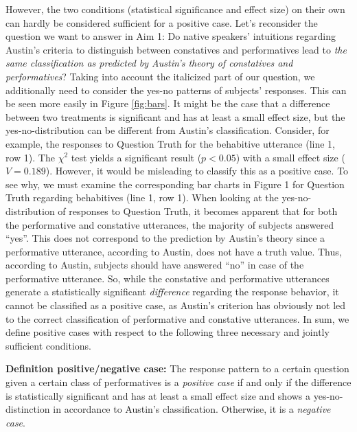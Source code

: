 \documentclass[egregdoesnotlikesansseriftitles,12pt]{scrartcl}
\begin{document}
\noindent However, the two conditions (statistical significance and effect size) on their own can hardly be considered sufficient for a positive case. Let's reconsider the question we want to answer in Aim 1: Do native speakers' intuitions regarding Austin's criteria to distinguish between constatives and performatives lead to \textit{the same classification as predicted by Austin's theory of constatives and performatives}? Taking into account the italicized part of our question, we additionally need to consider the yes-no patterns of subjects' responses. This can be seen more easily in Figure \ref{fig:bars}. It might be the case that a difference between two treatments is significant and has at least a small effect size, but the yes-no-distribution can be different from Austin's classification. Consider, for example, the responses to Question Truth for the behabitive utterance (line 1, row 1). The $\chi^2$ test yields a significant result ($p<0.05$) with a small effect size ($V=0.189$). However, it would be misleading to classify this as a positive case. To see why, we must examine the corresponding bar charts in Figure 1 for Question Truth regarding behabitives (line 1, row 1). When looking at the yes-no-distribution of responses to Question Truth, it becomes apparent that for both the performative and constative utterances, the majority of subjects answered ``yes''. This does not correspond to the prediction by Austin's theory since a performative utterance, according to Austin, does not have a truth value. Thus, according to Austin, subjects should have answered ``no'' in case of the performative utterance. So, while the constative and performative utterances generate a statistically significant \textit{difference} regarding the response behavior, it cannot be classified as a positive case, as Austin's criterion has obviously not led to the correct classification of performative and constative utterances. In sum, we define positive cases with respect to the following three necessary and jointly sufficient conditions.\\

\begin{addmargin}[11pt]{0pt}
   \textbf{Definition positive/negative case:} The response pattern to a certain question given a certain class of performatives is a \textit{positive case} if and only if the difference is statistically significant and has at least a small effect size and shows a yes-no-distinction in accordance to Austin's classification. Otherwise, it is a \textit{negative case}.\\
\end{addmargin}
\end{document}
